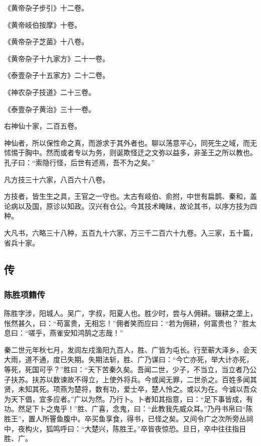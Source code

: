 \documentclass[]{article}
\begin{document}
《黄帝杂子步引》十二卷。

《黄帝岐伯按摩》十卷。

《黄帝杂子芝菌》十八卷。

《黄帝杂子十九家方》二十一卷。

《泰壹杂子十五家方》二十二卷。

《神农杂子技道》二十三卷。

《泰壹杂子黄治》三十一卷。

右神仙十家，二百五卷。

神仙者，所以保性命之真，而游求于其外者也。聊以荡意平心，同死生之域，而无怵惕于胸中。然而或者专以为务，则诞欺怪迂之文弥以益多，非圣王之所以教也。孔子曰：``索隐行怪，后世有述焉，吾不为之矣。''

凡方技三十六家，八百六十八卷。

方技者，皆生生之具，王官之一守也。太古有岐伯、俞拊，中世有扁鹊、秦和，盖论病以及国，原诊以知政。汉兴有仓公。今其技术晻昧，故论其书，以序方技为四种。

大凡书，六略三十八种，五百九十六家，万三千二百六十九卷。入三家，五十篇，省兵十家。

\hypertarget{header-n3412}{%
\subsection{传}\label{header-n3412}}

\hypertarget{header-n3413}{%
\subsubsection{陈胜项籍传}\label{header-n3413}}

陈胜字涉，阳城人。吴广，字叔，阳夏人也。胜少时，尝与人佣耕。辍耕之垄上，怅然甚久，曰：``苟富贵，无相忘！''佣者笑而应曰：``若为佣耕，何富贵也？''胜太息曰：``嗟乎，燕雀安知鸿鹄之志哉！''

秦二世元年秋七月，发闾左戍渔阳九百人，胜、广皆为屯长。行至蕲大泽乡，会天大雨，道不通，度已失期。失期法斩，胜、广乃谋曰：``今亡亦死，举大计亦死，等死，死国可乎？''胜曰：``天下苦秦久矣。吾闻二世，少子，不当立，当立者乃公子扶苏。扶苏以数谏故不得立，上使外将兵。今或闻无罪，二世杀之。百姓多闻其贤，未知其死。项燕为楚将，数有功，爱士卒，楚人怜之。或以为在。今诚以吾众为天下倡，宜多应者。''广以为然。乃行卜。卜者知其指意，曰：``足下事皆成，有功。然足下卜之鬼乎！''胜、广喜，念鬼，曰：``此教我先威众耳。''乃丹书帛曰``陈胜王''，置人所罾鱼腹中。卒买鱼享食，得书，已怪之矣。又间令广之次所旁丛祠中，夜构火，狐鸣呼曰：``大楚兴，陈胜王。''卒皆夜惊恐。旦日，卒中往往指目胜、广。
\end{document}
